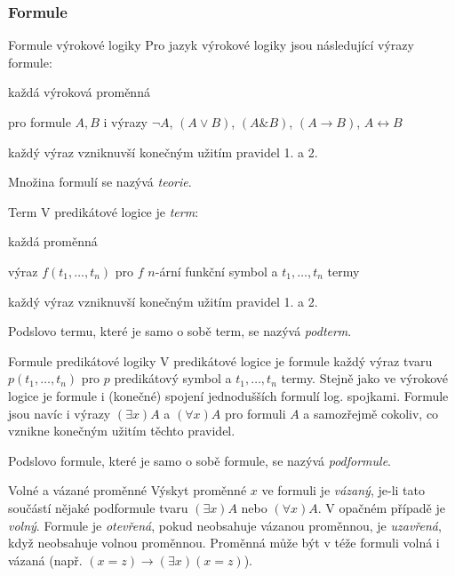 \subsubsection*{Formule}

\begin{definiceN}{Formule výrokové logiky}
Pro jazyk výrokové logiky jsou následující výrazy formule:
\begin{penumerate}
    \item každá výroková proměnná
    \item pro formule $A,B$ i výrazy $\neg A$, $(A\vee B)$, $(A\& B)$, $(A\rightarrow B)$,
	$A\leftrightarrow B$
    \item každý výraz vzniknuvší konečným užitím pravidel 1. a 2.
\end{penumerate}
Množina formulí se nazývá \emph{teorie}.
\end{definiceN}

\begin{definiceN}{Term}
V predikátové logice je \emph{term}:
\begin{penumerate}
    \item každá proměnná
    \item výraz $f(t_1,\dots,t_n)$ pro $f$ $n$-ární funkční symbol a $t_1,\dots,t_n$ termy
    \item každý výraz vzniknuvší konečným užitím pravidel 1. a 2.
\end{penumerate}
Podslovo termu, které je samo o sobě term, se nazývá \emph{podterm}.
\end{definiceN}

\begin{definiceN}{Formule predikátové logiky}
V predikátové logice je formule každý výraz tvaru $p(t_1,\dots,t_n)$ pro $p$ predikátový symbol a $t_1,\dots,t_n$ termy. Stejně jako ve výrokové logice je formule i (konečné) spojení jednodušších formulí log. spojkami.
Formule jsou navíc i výrazy $(\exists x)A$ a $(\forall x)A$ pro formuli $A$ a samozřejmě cokoliv, co vznikne konečným užitím těchto pravidel.

Podslovo formule, které je samo o sobě formule, se nazývá \emph{podformule}.
\end{definiceN}

\begin{definiceN}{Volné a vázané proměnné}
Výskyt proměnné $x$ ve formuli je \emph{vázaný}, je-li tato součástí nějaké podformule tvaru $(\exists x)A$ nebo $(\forall x)A$. V opačném případě je \emph{volný}. Formule je \emph{otevřená}, pokud neobsahuje vázanou proměnnou, je \emph{uzavřená}, když neobsahuje volnou proměnnou. Proměnná může být v téže formuli volná i vázaná (např. $(x=z)\rightarrow(\exists x)(x=z)$).
\end{definiceN}

